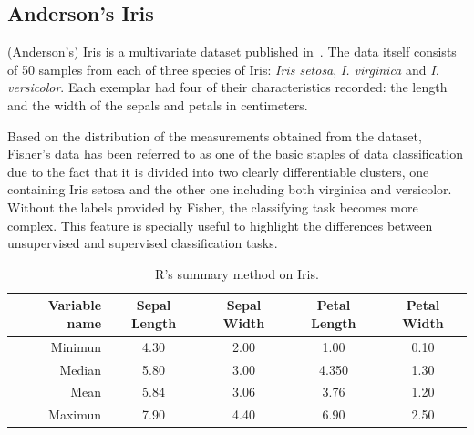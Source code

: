  

\subsection{Anderson's Iris}

(Anderson's) Iris is a multivariate dataset published in~\cite{Fisher_Iris}. The data itself consists of 50 samples from each of three species of Iris: \emph{Iris setosa}, \emph{I. virginica} and \emph{I. versicolor}. Each exemplar had four of their characteristics recorded: the length and the width of the sepals and petals in centimeters. \par

Based on the distribution of the measurements obtained from the dataset, Fisher's data has been referred to as one of the basic staples of data classification due to the fact that it is divided into two clearly differentiable clusters, one containing Iris setosa and the other one including both virginica and versicolor. Without the labels provided by Fisher, the classifying task becomes more complex. This feature is specially useful to highlight the differences between unsupervised and supervised classification tasks. %
% 
\begin{table}[H]
		\caption{R's summary method on Iris.}
	\begin{center}
	\label{tab:table_Iris}
		\begin{tabular}{r|c|c|c|c} %
			\textbf{Variable name} & \textbf{Sepal Length} & \textbf{Sepal Width} & \textbf{Petal Length} & \textbf{Petal Width}\\
			\hline
			Minimun & 4.30 & 2.00 & 1.00 & 0.10\\
			Median & 5.80 & 3.00 & 4.350 & 1.30\\
			Mean & 5.84 & 3.06 & 3.76 & 1.20\\
			Maximun & 7.90 & 4.40 & 6.90 & 2.50\\
		\end{tabular}
	\end{center}
\end{table}

